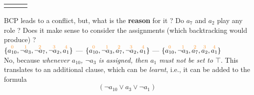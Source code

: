 \begin{frame}
\begin{tabular}{ccc}
\begin{minipage}{.5\textwidth}
$$  $$
  \end{minipage}
  \end{tabular}
  \vfill
  BCP leads to a conflict, but, what is the {\bf reason} for it ?
  Do $a_7$ and $a_2$ play any role ?
  \vfill
  Does it make sense to consider the assignments (which backtracking would produce) ?\\
  $\{ \dec{a_{10}}{0}, \dec{\neg a_3}{1}, \dec{\neg a_7}{2}, \dec{\neg a_2}{3}, \dec{a_1}{4} \}$ ---
  $\{ \dec{a_{10}}{0}, \dec{\neg a_3}{1}, \dec{a_7}{2}, \dec{\neg a_2}{3}, \dec{a_1}{4} \}$ ---
  $\{ \dec{a_{10}}{0}, \dec{\neg a_3}{1}, \dec{a_7}{2}, \dec{a_2}{3}, \dec{a_1}{4} \}$ \\
  \vfill
  No, because {\em whenever $a_{10}$, $\neg a_3$ is assigned, then $a_1$ must not be set to $\top$}.
  This translates to an additional clause, which can be {\em learnt}, i.e., it can be added to the formula 
  $$(\neg a_{10} \vee a_3 \vee \neg a_1)$$
   
\end{frame}

